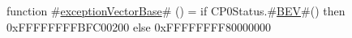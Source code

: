 function #\hyperref[zexceptionVectorBase]{exceptionVectorBase}# () =
  if CP0Status.#\hyperref[zBEV]{BEV}#() then
   0xFFFFFFFFBFC00200
  else
   0xFFFFFFFF80000000
